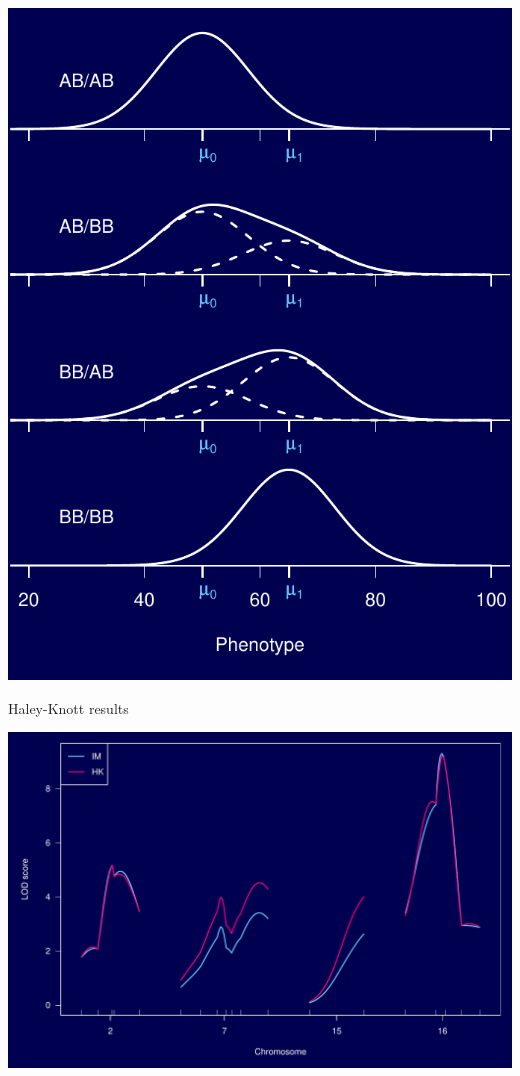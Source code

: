 \documentclass[12pt]{article}
\newcommand{\headsize}{\fontsize{35}{35} \selectfont}
\begin{document}
\begin{minipage}[t]{4.6in}
\vspace*{0mm}

\includegraphics{FigsA/mixtures.pdf}
\end{minipage}




\newpage

\headsize \color{myyellow}
\hfill \begin{minipage}{5.75in}
\centering
Haley-Knott results
\end{minipage}

\vfill

\centerline{\includegraphics{FigsA/hk_lod.pdf}}
\end{document}
